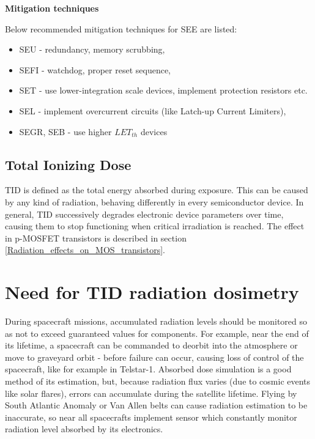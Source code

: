         \bigskip\textbf{Mitigation techniques}

        Below recommended mitigation techniques for SEE are listed:
        \begin{itemize}
            \item SEU - redundancy, memory scrubbing,
            \item SEFI - watchdog, proper reset sequence,
            \item SET - use lower-integration scale devices, implement protection resistors etc.
            \item SEL - implement overcurrent circuits (like Latch-up Current Limiters),
            \item SEGR, SEB - use higher $LET_{th}$ devices
        \end{itemize}

    \subsection{Total Ionizing Dose}
        TID is defined as the total energy absorbed during exposure. This can be caused by any kind of radiation, behaving differently in every semiconductor device. In general, TID successively degrades electronic device parameters over time, causing them to stop functioning when critical irradiation is reached. The effect in p-MOSFET transistors is described in section \ref{Radiation_effects_on_MOS_transistors}.

\section{Need for TID radiation dosimetry}
    During spacecraft missions, accumulated radiation levels should be monitored so as not to exceed guaranteed values for components. For example, near the end of its lifetime, a spacecraft can be commanded to deorbit into the atmosphere or move to graveyard orbit - before failure can occur, causing loss of control of the spacecraft, like for example in Telstar-1.
    Absorbed dose simulation is a good method of its estimation, but, because radiation flux varies (due to cosmic events like solar flares), errors can accumulate during the satellite lifetime. Flying by South Atlantic Anomaly or Van Allen belts can cause radiation estimation to be inaccurate, so near all spacecrafts implement sensor which constantly monitor radiation level absorbed by its electronics.

